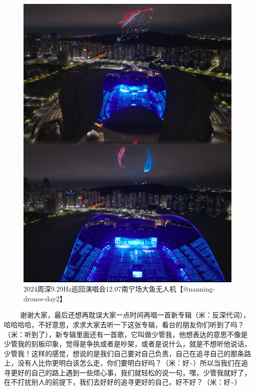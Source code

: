 \documentclass[]{ctexbook}
\begin{document}
\begin{figure}

{\centering \includegraphics[width=400pt]{img/nanning20241207/003} 

}

\caption{2024周深9.29Hz巡回演唱会12.07南宁场大鱼无人机【@nanning-drones-day2】}\label{fig:unnamed-chunk-168}
\end{figure}

   谢谢大家，最后还想再耽误大家一点时间再唱一首新专辑（米：反深代词），哈哈哈哈，不好意思，求求大家去听一下这张专辑，看台的朋友你们听到了吗？（米：听到了），新专辑里面还有一首歌，它叫做少管我，他想表达的意思不像是少管我的刻板印象，觉得是争执或者是吵架，或者是说什么，就是不想听他说话，少管我！这样的感觉，想说的是我们自己要对自己负责，自己在追寻自己的那条路上，没有人比你更明白该怎么走，你们要明白好吗？（米：好\textasciitilde）所以当我们在追寻更好的自己的路上遇到一些烦心事，我们就轻松的说一句，嘿，少管我就好了，在不打扰别人的前提下，我们去好好的追寻更好的自己，好不好？（米：好\textasciitilde）
\end{document}
